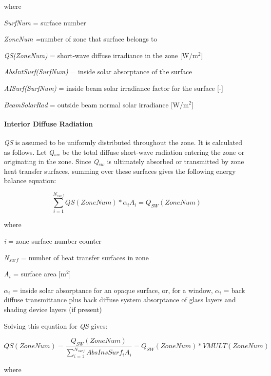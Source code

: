 where

\emph{SurfNum} = surface number

\emph{ZoneNum =}number of zone that surface belongs to

\emph{QS(ZoneNum)} = short-wave diffuse irradiance in the zone {[}W/m\(^{2}\){]}

\emph{AbsIntSurf(SurfNum)} = inside solar absorptance of the surface

\emph{AISurf(SurfNum)} = inside beam solar irradiance factor for the surface {[}-{]}

\emph{BeamSolarRad} = outside beam normal solar irradiance {[}W/m\(^{2}\){]}

\paragraph{Interior Diffuse Radiation}\label{interior-diffuse-radiation}

\emph{QS} is assumed to be uniformly distributed throughout the zone. It is calculated as follows. Let \emph{Q\(_{sw}\)} be the total diffuse short-wave radiation entering the zone or originating in the zone. Since \emph{Q\(_{sw}\)} is ultimately absorbed or transmitted by zone heat transfer surfaces, summing over these surfaces gives the following energy balance equation:

\begin{equation}
\sum\limits_{i = 1}^{{N_{surf}}} {QS(ZoneNum)*{\alpha_i}{A_i} = {Q_{SW}}(ZoneNum)}
\end{equation}

where

\emph{i} = zone surface number counter

\emph{N\(_{surf}\)} = number of heat transfer surfaces in zone

\emph{A\(_{i}\)} = surface area {[}m\(^{2}\){]}

\({\alpha_i}\) = inside solar absorptance for an opaque surface, or, for a window, $\alpha_i$ = back diffuse transmittance plus back diffuse system absorptance of glass layers and shading device layers (if present)

Solving this equation for \emph{QS} gives:

\begin{equation}
QS(ZoneNum) = \frac{{{Q_{SW}}(ZoneNum)}}{{\sum\limits_{i = 1}^{{N_{surf}}} {AbsInsSur{f_i}{A_i}} }} = {Q_{SW}}(ZoneNum)*VMULT(ZoneNum)
\end{equation}

where

